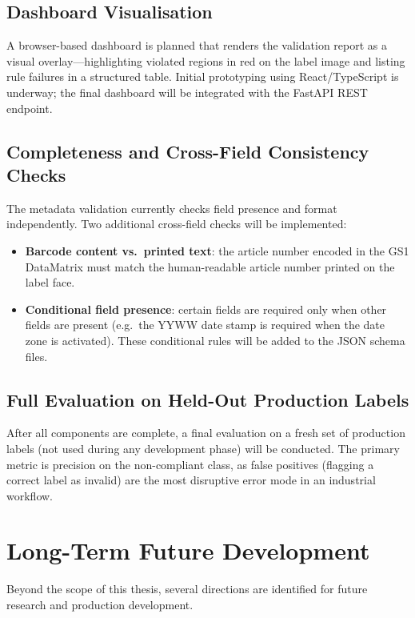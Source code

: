 \subsection{Dashboard Visualisation}

A browser-based dashboard is planned that renders the validation report as a visual
overlay—highlighting violated regions in red on the label image and listing rule
failures in a structured table. Initial prototyping using React/TypeScript is
underway; the final dashboard will be integrated with the FastAPI REST endpoint.

\subsection{Completeness and Cross-Field Consistency Checks}

The metadata validation currently checks field presence and format independently.
Two additional cross-field checks will be implemented:
\begin{itemize}
  \item \textbf{Barcode content vs.\ printed text}: the article number encoded in the
  GS1 DataMatrix must match the human-readable article number printed on the label face.
  \item \textbf{Conditional field presence}: certain fields are required only when
  other fields are present (e.g.\ the YYWW date stamp is required when the date zone
  is activated). These conditional rules will be added to the JSON schema files.
\end{itemize}

\subsection{Full Evaluation on Held-Out Production Labels}

After all components are complete, a final evaluation on a fresh set of production labels
(not used during any development phase) will be conducted. The primary metric is
precision on the non-compliant class, as false positives (flagging a correct label as
invalid) are the most disruptive error mode in an industrial workflow.

\section{Long-Term Future Development}

Beyond the scope of this thesis, several directions are identified for future research
and production development.

